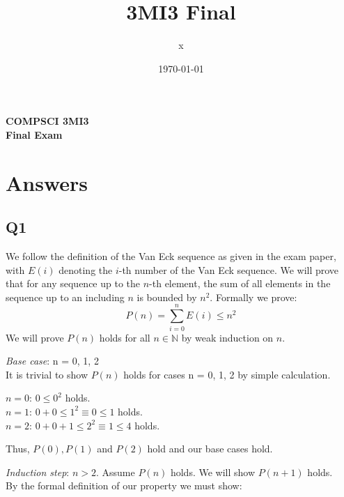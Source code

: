 \documentclass[12pt, fleqn]{article}
\title{3MI3 Final}
\author{x}
\date{\today}
\begin{document}
\begin{center}

    {\large \textbf{COMPSCI 3MI3}}\\[8mm]
    {\huge \textbf{Final Exam}}\\[6mm]

\end{center}

\medskip

\section{Answers}

\subsection{Q1}
We follow the definition of the Van Eck sequence as given in the exam paper, with $E(i)$ denoting the $i$-th number of the Van Eck sequence. We will prove that for any sequence up to the $n$-th element, the sum of all elements in the sequence up to an including $n$ is bounded by $n^2$. Formally we prove:
$$
P(n) = \sum_{i=0}^{n}{E(i)} \leq n^2
$$
We will prove $P(n)$ holds for all $n \in \mathbb{N}$ by weak induction on $n$.

\medskip
\emph{Base case}: n = 0, 1, 2\\
It is trivial to show $P(n)$ holds for cases n = 0, 1, 2 by simple calculation.

$n = 0$: $0 \leq 0^2$ holds.\\
$n = 1$: $0 + 0 \leq 1^2 \equiv 0 \leq 1$ holds.\\
$n = 2$: $0 + 0 + 1 \leq 2^2 \equiv 1 \leq 4$ holds.

\medskip
Thus, $P(0), P(1)$ and $P(2)$ hold and our base cases hold.

\medskip
\emph{Induction step}: $n > 2$. Assume $P(n)$ holds. We will show $P(n+1)$ holds.\\
By the formal definition of our property we must show:
\end{document}
